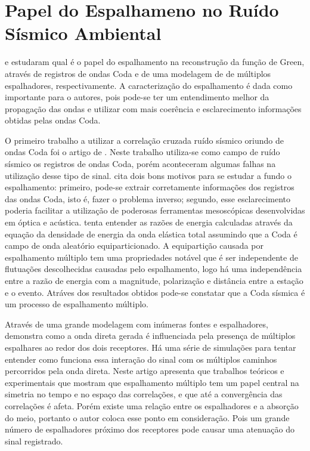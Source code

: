 \documentclass[paper,twocolumn]{geophysics}
\begin{document}
\section*{Papel do Espalhameno no Ruído Sísmico Ambiental}

\cite{hennino_observation_2001} e \cite{larose_fluctuations_2008} estudaram qual é o papel do espalhamento na reconstrução da função de Green, através de registros de ondas Coda e de uma modelagem de de múltiplos espalhadores, respectivamente. A caracterização do espalhamento é dada como importante para o autores, pois pode-se ter um entendimento melhor da propagação das ondas e utilizar com mais coerência e esclarecimento informações obtidas pelas ondas Coda.

O primeiro trabalho a utilizar a correlação cruzada ruído sísmico oriundo de ondas Coda foi o artigo de \cite{campillo_long-range_2003}. Neste trabalho utiliza-se como campo de ruído sísmico os registros de ondas Coda, porém aconteceram algumas falhas na utilização desse tipo de sinal. \cite{hennino_observation_2001} cita dois bons motivos para se estudar a fundo o espalhamento: primeiro, pode-se extrair corretamente informações dos registros das ondas Coda, isto é, fazer o problema inverso; segundo, esse esclarecimento poderia facilitar a utilização de poderosas ferramentas mesoscópicas desenvolvidas em óptica e acústica. \cite{hennino_observation_2001} tenta entender as razões de energia calculadas através da equação da densidade de energia da onda elástica total assumindo que a Coda é campo de onda aleatório equiparticionado. A equipartição causada por espalhamento múltiplo tem uma propriedades notável que é ser independente de flutuações descolhecidas causadas pelo espalhamento, logo há uma independência entre a razão de energia com a magnitude, polarização e distância entre a estação e o evento. Atráves dos resultados obtidos pode-se constatar que a Coda sísmica é um processo de espalhamento múltiplo.

Através de uma grande modelagem com inúmeras fontes e espalhadores, \cite{larose_fluctuations_2008} demonstra como a onda direta gerada é influenciada pela presença de múltiplos espalhares ao redor dos dois receptores. Há uma série de simulações para tentar entender como funciona essa interação do sinal com os múltiplos caminhos percorridos pela onda direta. Neste artigo \cite{larose_fluctuations_2008} apresenta que trabalhos  teóricos e experimentais que mostram que espalhamento múltiplo tem um papel central na simetria no tempo e no espaço das correlações, e que até a convergência das correlações é afeta. Porém existe uma relação entre os espalhadores e a absorção do meio, portanto o autor coloca esse ponto em consideração. Pois um grande número de espalhadores próximo dos receptores pode causar uma atenuação do sinal registrado.
 
\end{document}
